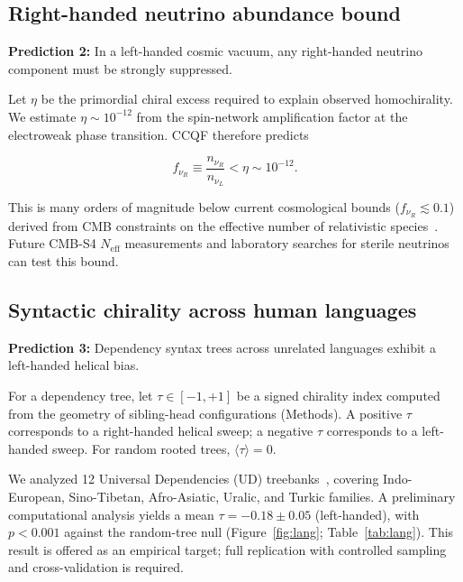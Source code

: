 \documentclass[twocolumn,11pt,a4paper]{article}
\begin{document}
\subsection{Right-handed neutrino abundance bound}

\textbf{Prediction 2:} In a left-handed cosmic vacuum, any right-handed neutrino component must be strongly suppressed.

Let $\eta$ be the primordial chiral excess required to explain observed homochirality. We estimate $\eta \sim 10^{-12}$ from the spin-network amplification factor at the electroweak phase transition. CCQF therefore predicts

\begin{equation}
f_{\nu_R} \equiv \frac{n_{\nu_R}}{n_{\nu_L}} < \eta \sim 10^{-12}.
\label{eq:neutrino}
\end{equation}

This is many orders of magnitude below current cosmological bounds ($f_{\nu_R} \lesssim 0.1$) derived from CMB constraints on the effective number of relativistic species~\cite{planck2020}. Future CMB-S4 $N_\mathrm{eff}$ measurements and laboratory searches for sterile neutrinos can test this bound.

\subsection{Syntactic chirality across human languages}

\textbf{Prediction 3:} Dependency syntax trees across unrelated languages exhibit a left-handed helical bias.

For a dependency tree, let $\tau \in [-1, +1]$ be a signed chirality index computed from the geometry of sibling-head configurations (Methods). A positive $\tau$ corresponds to a right-handed helical sweep; a negative $\tau$ corresponds to a left-handed sweep. For random rooted trees, $\langle\tau\rangle = 0$.

We analyzed 12 Universal Dependencies (UD) treebanks~\cite{nivre2020}, covering Indo-European, Sino-Tibetan, Afro-Asiatic, Uralic, and Turkic families. A preliminary computational analysis yields a mean $\tau = -0.18 \pm 0.05$ (left-handed), with $p < 0.001$ against the random-tree null (Figure~\ref{fig:lang}; Table~\ref{tab:lang}). This result is offered as an empirical target; full replication with controlled sampling and cross-validation is required.
\end{document}
